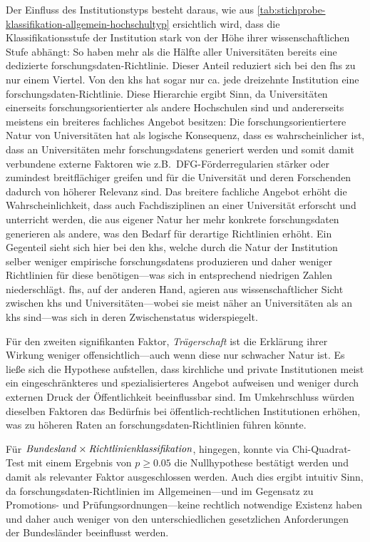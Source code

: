 Der Einfluss des Institutionstyps besteht daraus, wie aus \cref{tab:stichprobe-klassifikation-allgemein-hochschultyp} ersichtlich wird, dass die Klassifikationsstufe der Institution stark von der Höhe ihrer wissenschaftlichen Stufe abhängt:
So haben mehr als die Hälfte aller Universitäten bereits eine dedizierte \gls{forschungsdaten}-Richtlinie. 
Dieser Anteil reduziert sich bei den \glspl{fh} zu nur einem Viertel.
Von den \glspl{kh} hat sogar nur ca. jede dreizehnte Institution eine \gls{forschungsdaten}-Richtlinie.
Diese Hierarchie ergibt Sinn, da Universitäten einerseits forschungsorientierter als andere Hochschulen sind und andererseits meistens ein breiteres fachliches Angebot besitzen:
Die forschungsorientiertere Natur von Universitäten hat als logische Konsequenz, dass es wahrscheinlicher ist, dass an Universitäten mehr \glspl{forschungsdaten} generiert werden und somit damit verbundene externe Faktoren wie z.B.~DFG-Förderregularien stärker oder zumindest breitflächiger greifen und für die Universität und deren Forschenden dadurch von höherer Relevanz sind.
Das breitere fachliche Angebot erhöht die Wahrscheinlichkeit, dass auch Fachdisziplinen an einer Universität erforscht und unterricht werden, die aus eigener Natur her mehr konkrete \gls{forschungsdaten} generieren als andere, was den Bedarf für derartige Richtlinien erhöht.
Ein Gegenteil sieht sich hier bei den \glspl{kh}, welche durch die Natur der Institution selber weniger empirische \glspl{forschungsdaten} produzieren und daher weniger Richtlinien für diese benötigen---was sich in entsprechend niedrigen Zahlen niederschlägt.
\glspl{fh}, auf der anderen Hand, agieren aus wissenschaftlicher Sicht zwischen \glspl{kh} und Universitäten---wobei sie meist näher an Universitäten als an \glspl{kh} sind---was sich in deren Zwischenstatus widerspiegelt. 

Für den zweiten signifikanten Faktor, \textit{Trägerschaft} ist die Erklärung ihrer Wirkung weniger offensichtlich---auch wenn diese nur schwacher Natur ist.
Es ließe sich die Hypothese aufstellen, dass kirchliche und private Institutionen meist ein eingeschränkteres und spezialisierteres Angebot aufweisen und weniger durch externen Druck der Öffentlichkeit beeinflussbar sind.
Im Umkehrschluss würden dieselben Faktoren das Bedürfnis bei öffentlich-rechtlichen Institutionen erhöhen, was zu höheren Raten an \gls{forschungsdaten}-Richtlinien führen könnte.

Für $\text{\textit{Bundesland}}\times\text{\textit{Richtlinienklassifikation}}$, hingegen, konnte via Chi-Quadrat-Test mit einem Ergebnis von $p\geqslant\num{0,05}$ die Nullhypothese bestätigt werden und damit als relevanter Faktor ausgeschlossen werden.
Auch dies ergibt intuitiv Sinn, da \gls{forschungsdaten}-Richtlinien im Allgemeinen---und im Gegensatz zu Promotions- und Prüfungsordnungen---keine rechtlich notwendige Existenz haben und daher auch weniger von den unterschiedlichen gesetzlichen Anforderungen der Bundesländer beeinflusst werden.

